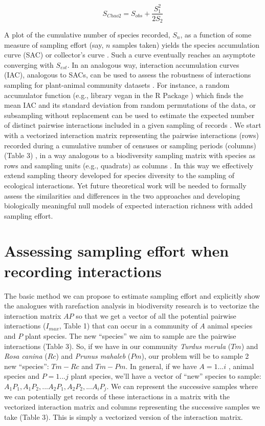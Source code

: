 \documentclass[12pt]{article}
\begin{document}
$$S_{Chao2}= S_{obs} + \frac{S_1^2}{2S_2}$$ 

A plot of the cumulative number of species recorded, $S_n$, as a function of some measure of sampling effort (say, $n$ samples taken) yields the species accumulation curve (SAC) or collector's curve \citep{Colwell:1994vt}. Such a curve eventually reaches an asymptote converging with $S_{est}$. In an analogous way, interaction accumulation curves (IAC), analogous to SACs, can be used to assess the robustness of interactions sampling for plant-animal community datasets \citep{E31/2562,Jordano:2009c,Olesen:2011a}. For instance, a random accumulator function (e.g., library vegan in the R Package \citep{RCoreTeam:2010}) which finds the mean IAC and its standard deviation from random permutations of the data, or subsampling without replacement \citep{Gotelli:2001uo} can be used to estimate the expected number of distinct pairwise interactions included in a given sampling of records \citep{Jordano:2009c,Olesen:2011a}. We start with a vectorized interaction matrix representing the pairwise interactions (rows) recorded during a cumulative number of censuses or sampling periods (columns) (Table 3) , in a way analogous to a biodiversity sampling matrix with species as rows and sampling units (e.g., quadrats) as columns \citep{Jordano:2009c}. In this way we effectively extend sampling theory developed for species diversity to the sampling of ecological interactions. Yet future theoretical work will be needed to formally assess the similarities and differences in the two approaches and developing biologically meaningful null models of expected interaction richness with added sampling effort. 
\section*{Assessing sampling effort when recording interactions}
\label{assessingsamplingeffortwhenrecordinginteractions}

The basic method we can propose to estimate sampling effort and explicitly show the analogues with rarefaction analysis in biodiversity research is to vectorize the interaction matrix $AP$ so that we get a vector of all the potential pairwise interactions ($I_{max}$, Table 1) that can occur in a community of $A$ animal species and $P$ plant species. The new ``species'' we aim to sample are the pairwise interactions (Table 3). So, if we have in our community \emph{Turdus merula} ($Tm$) and \emph{Rosa canina} ($Rc$) and \emph{Prunus mahaleb} ($Pm$), our problem will be to sample 2 new ``species'': $Tm-Rc$ and $Tm-Pm$. In general, if we have $A= 1... i$ , animal species and $P = 1... j$ plant species, we'll have a vector of ``new'' species to sample: $A_1P_1, A_1P_2,... A_2P_1, A_2P_2, ... A_iP_j$. We can represent the successive samples where we can potentially get records of these interactions in a matrix with the vectorized interaction matrix and columns representing the successive samples we take (Table 3). This is simply a vectorized version of the interaction matrix.
\end{document}
